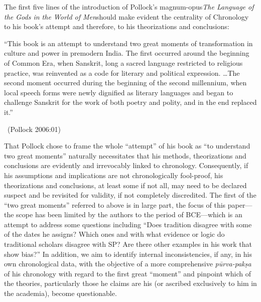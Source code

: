 The first five lines of the introduction of Pollock’s magnum-opus\textit{The Language of the Gods in the World of Men}should make evident the centrality of Chronology to his book’s attempt and therefore, to his theorizations and conclusions:

\begin{myquote}
“This book is an attempt to understand two great moments of transformation in culture and power in premodern India. The first occurred around the beginning of Common Era, when Sanskrit, long a sacred language restricted to religious practice, was reinvented as a code for literary and political expression. …The second moment occurred during the beginning of the second millennium, when local speech forms were newly dignified as literary languages and began to challenge Sanskrit for the work of both poetry and polity, and in the end replaced it.” 

~\hfill (Pollock 2006:01)
\end{myquote}

That Pollock chose to frame the whole “attempt” of his book as “to understand two great moments” naturally necessitates that his methods, theorizations and conclusions are evidently and irrevocably linked to chronology. Consequently, if his assumptions and implications are not chronologically fool-proof, his theorizations and conclusions, at least some if not all, may need to be declared suspect and be revisited for validity, if not completely discredited. The first of the “two great moments” referred to above is in large part, the focus of this paper—the scope has been limited by the authors to the period of BCE—which is an attempt to address some questions including “Does tradition disagree with some of the dates he assigns? Which ones and with what evidence or logic do traditional scholars disagree with SP? Are there other examples in his work that show bias?” In addition, we aim to identify internal inconsistencies, if any, in his own chronological data, with the objective of a more comprehensive \textit{pūrva-pakṣa} of his chronology with regard to the first great “moment” and pinpoint which of the theories, particularly those he claims are his (or ascribed exclusively to him in the academia), become questionable.

